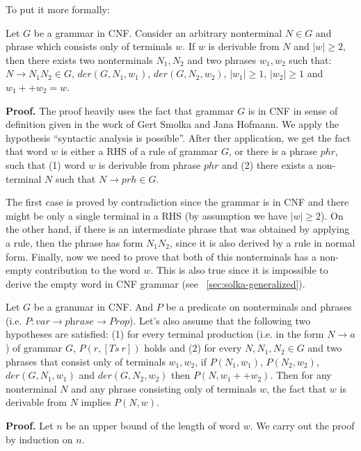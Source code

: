 To put it more formally: 
\begin{lemma} \label{lemma:chomskyind1}
Let $G$ be a grammar in CNF. Consider an arbitrary nonterminal $N \in G$ and phrase which consists only of terminals $w$. 
If $w$ is derivable from $N$ and $|w| \ge 2$, then there exists two nonterminals $N_1, N_2$ and two phrases $w_1, w_2$ such that: $N \to N_1 N_2 \in G$, $der(G, N_1, w_1)$, $der(G, N_2, w_2)$, $|w_1| \ge 1$, $|w_2| \ge 1$ and $w_1 ++ w_2 = w$.
\end{lemma}


\textbf{Proof.}
The proof heavily uses the fact that grammar $G$ is in CNF in sense of definition given in the work of Gert Smolka and Jana Hofmann.
We apply the hypothesis ``syntactic analysis is possible''. After ther application, we get the fact that word $w$ is either a RHS of a rule of grammar $G$, or there is a phrase $phr$, such that (1) word $w$ is derivable from phrase $phr$ and (2) there exists a non-terminal $N$ such that $N \to prh \in G$.

The first case is proved by contradiction since the grammar is in CNF and there might be only a single terminal in a RHS (by assumption we have $|w| \ge 2$).
On the other hand, if there is an intermediate phrase that was obtained by applying a rule, then the phrase has form $N_1 N_2$, since it is also derived by a rule in normal form.
Finally, now we need to prove that both of this nonterminals has a non-empty contribution to the word $w$. This is also true since it is impossible to derive the empty word in CNF grammar (see ~\ref{sec:solka-generalized}).

\begin{lemma}
	Let $G$ be a grammar in CNF. And $P$ be a predicate on nonterminals and phrases (i.e. $P: var \to \textit{phrase} \to \textit{Prop}$).
	Let's also assume that the following two hypotheses are satisfied:
	(1) for every terminal production (i.e. in the form $N \to a$) of grammar $G$, $P(r, [Ts \ r])$ holds and (2) for every $N, N_1, N_2 \in G$ and two phrases that consist only of terminals $w_1, w_2$, if $P(N_1, w_1)$, $P(N_2, w_2)$, $der(G, N_1, w_1)$ and $der(G, N_2, w_2)$ then $P(N, w_1 ++ w_2)$.
	Then for any nonterminal $N$ and any phrase consisting only of terminals $w$, the fact that $w$ is derivable from $N$ implies $P(N,w)$.
\end{lemma}

\textbf{Proof.} 
Let $n$ be an upper bound of the length of word $w$. We carry out the proof by induction on $n$.

